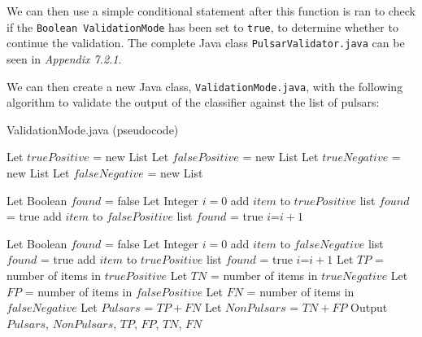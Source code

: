 \documentclass{article}
\begin{document}
We can then use a simple conditional statement after this function is ran to check if the \verb|Boolean ValidationMode| has been set to \verb|true|, to determine whether to continue the validation. The complete Java class \verb|PulsarValidator.java| can be seen in \emph{Appendix 7.2.1}.

We can then create a new Java class, \verb|ValidationMode.java|, with the following algorithm to validate the output of the classifier against the list of pulsars:

\begin{algorithm}[H]
    \caption{ValidationMode.java (pseudocode)}
    \begin{algorithmic}
        \State Let $truePositive$ = new List
        \State Let $falsePositive$ = new List
        \State Let $trueNegative$ = new List
        \State Let $falseNegative$ = new List
        
            \State Let Boolean $found$ = false
            \State Let Integer $i=0$
                    \State add $item$ to $truePositive$ list
                    \State $found$ = true
                    \State add $item$ to $falsePositive$ list
                    \State $found$ = true
                \Else
                    \State $i$=$i+1$
                \EndIf
            \EndWhile
        \EndFor

            \State Let Boolean $found$ = false
            \State Let Integer $i=0$
                    \State add $item$ to $falseNegative$ list
                    \State $found$ = true
                    \State add $item$ to $truePositive$ list
                    \State $found$ = true
                \Else
                    \State $i$=$i+1$
                \EndIf
            \EndWhile
        \EndFor
        \State Let $TP$ = number of items in $truePositive$
        \State Let $TN$ = number of items in $trueNegative$
        \State Let $FP$ = number of items in $falsePositive$
        \State Let $FN$ = number of items in $falseNegative$
        \State Let $Pulsars$ = $TP+FN$
        \State Let $NonPulsars$ = $TN+FP$
        \State Output $Pulsars$, $NonPulsars$, $TP$, $FP$, $TN$, $FN$
    \end{algorithmic}
\end{algorithm}
\end{document}
